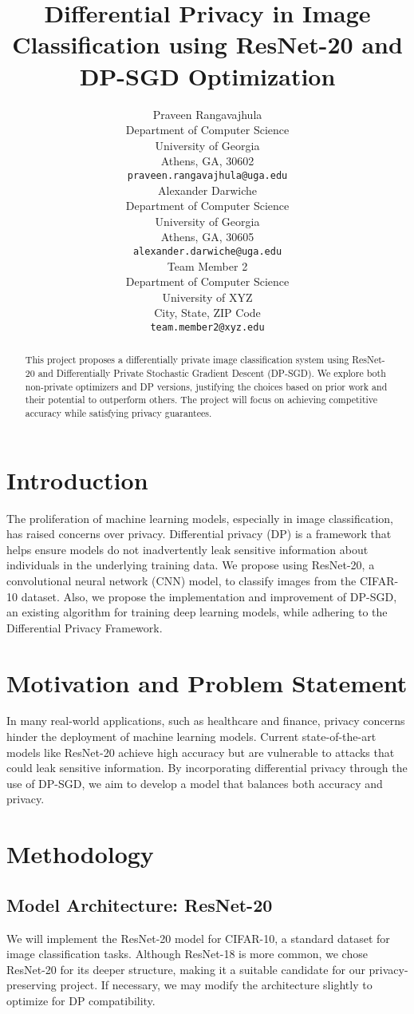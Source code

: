 \documentclass{article}
\title{Differential Privacy in Image Classification using ResNet-20 and DP-SGD Optimization}
\author{
  Praveen Rangavajhula\\
  Department of Computer Science\\
  University of Georgia\\
  Athens, GA, 30602\\
  \texttt{praveen.rangavajhula@uga.edu} \\
  \And
  Alexander Darwiche\\
  Department of Computer Science\\
  University of Georgia\\
  Athens, GA, 30605 \\
  \texttt{alexander.darwiche@uga.edu} \\
  \And
  Team Member 2 \\
  Department of Computer Science\\
  University of XYZ\\
  City, State, ZIP Code \\
  \texttt{team.member2@xyz.edu} \\
}
\begin{document}
\maketitle

\begin{abstract}
  This project proposes a differentially private image classification system using ResNet-20 and Differentially Private Stochastic Gradient Descent (DP-SGD). We explore both non-private optimizers and DP versions, justifying the choices based on prior work and their potential to outperform others. The project will focus on achieving competitive accuracy while satisfying privacy guarantees.
\end{abstract}

\section{Introduction}
The proliferation of machine learning models, especially in image classification, has raised concerns over privacy. Differential privacy (DP) is a framework that helps ensure models do not inadvertently leak sensitive information about individuals in the underlying training data. We propose using ResNet-20, a convolutional neural network (CNN) model, to classify images from the CIFAR-10 dataset. Also, we propose the implementation and improvement of DP-SGD, an existing algorithm for training deep learning models, while adhering to the Differential Privacy Framework.

\section{Motivation and Problem Statement}
In many real-world applications, such as healthcare and finance, privacy concerns hinder the deployment of machine learning models. Current state-of-the-art models like ResNet-20 achieve high accuracy but are vulnerable to attacks that could leak sensitive information. By incorporating differential privacy through the use of DP-SGD, we aim to develop a model that balances both accuracy and privacy.

\section{Methodology}
\subsection{Model Architecture: ResNet-20}
We will implement the ResNet-20 model for CIFAR-10, a standard dataset for image classification tasks. Although ResNet-18 is more common, we chose ResNet-20 for its deeper structure, making it a suitable candidate for our privacy-preserving project. If necessary, we may modify the architecture slightly to optimize for DP compatibility.
\end{document}
